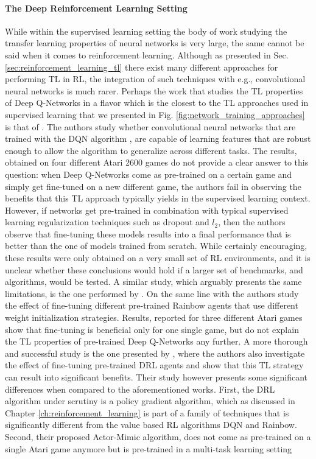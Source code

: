 \paragraph{The Deep Reinforcement Learning Setting}
While within the supervised learning setting the body of work studying the transfer learning properties of neural networks is very large, the same cannot be said when it comes to reinforcement learning. Although as presented in Sec. \ref{sec:reinforcement_learning_tl} there exist many different approaches for performing TL in RL, the integration of such techniques with e.g., convolutional neural networks is much rarer. Perhaps the work that studies the TL properties of Deep Q-Networks in a flavor which is the closest to the TL approaches used in supervised learning that we presented in Fig. \ref{fig:network_training_approaches} is that of \citet{farebrother2018generalization}. The authors study whether convolutional neural networks that are trained with the DQN algorithm \cite{mnih2015human}, are capable of learning features that are robust enough to allow the algorithm to generalize across different tasks. The results, obtained on four different Atari 2600 games do not provide a clear answer to this question: when Deep Q-Networks come as pre-trained on a certain game and simply get fine-tuned on a new different game, the authors fail in observing the benefits that this TL approach typically yields in the supervised learning context. However, if networks get pre-trained in combination with typical supervised learning regularization techniques such as dropout \cite{srivastava2014dropout} and $l_2$, then the authors observe that fine-tuning these models results into a final performance that is better than the one of models trained from scratch. While certainly encouraging, these results were only obtained on a very small set of RL environments, and it is unclear whether these conclusions would hold if a larger set of benchmarks, and algorithms, would be tested. A similar study, which arguably presents the same limitations, is the one performed by \citet{tyo2020transferable}. On the same line with \citet{farebrother2018generalization} the authors study the effect of fine-tuning different pre-trained Rainbow agents \cite{hessel2018rainbow} that use different weight initialization strategies. Results, reported for three different Atari games show that fine-tuning is beneficial only for one single game, but do not explain the TL properties of pre-trained Deep Q-Networks any further. A more thorough and successful study is the one presented by \citet{parisotto2015actor}, where the authors also investigate the effect of fine-tuning pre-trained DRL agents and show that this TL strategy can result into significant benefits. Their study however presents some significant differences when compared to the aforementioned works. First, the DRL algorithm under scrutiny is a policy gradient algorithm, which as discussed in Chapter \ref{ch:reinforcement_learning} is part of a family of techniques that is significantly different from the value based RL algorithms DQN and Rainbow. Second, their proposed Actor-Mimic algorithm, does not come as pre-trained on a single Atari game anymore but is pre-trained in a multi-task learning setting 